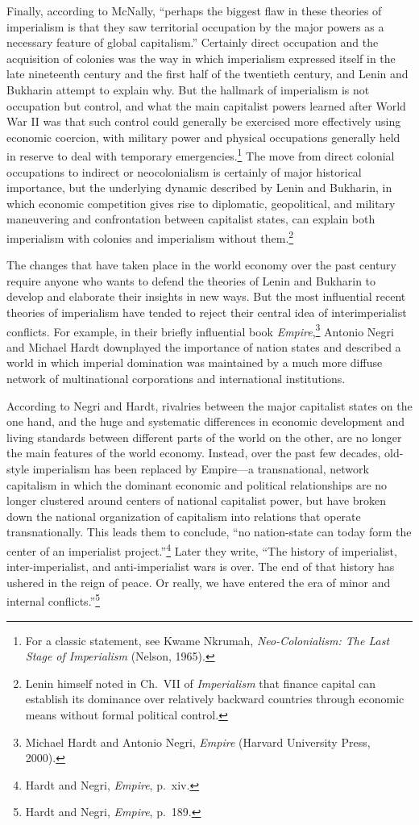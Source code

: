 Finally, according to McNally, ``perhaps the biggest flaw in these theories of imperialism is that they saw territorial occupation by the major powers as a necessary feature of global capitalism.'' Certainly direct occupation and the acquisition of colonies was the way in which imperialism expressed itself in the late nineteenth century and the first half of the twentieth century, and Lenin and Bukharin attempt to explain why. But the hallmark of imperialism is not occupation but control, and what the main capitalist powers learned after World War II was that such control could generally be exercised more effectively using economic coercion, with military power and physical occupations generally held in reserve to deal with temporary emergencies.\footnote{For a classic statement, see Kwame Nkrumah, \emph{Neo-Colonialism: The Last Stage of Imperialism} (Nelson, 1965).} The move from direct colonial occupations to indirect or neocolonialism is certainly of major historical importance, but the underlying dynamic described by Lenin and Bukharin, in which economic competition gives rise to diplomatic, geopolitical, and military maneuvering and confrontation between capitalist states, can explain both imperialism with colonies and imperialism without them.\footnote{Lenin himself noted in Ch.\ VII of \emph{Imperialism} that finance capital can establish its dominance over relatively backward countries through economic means without formal political control.}

The changes that have taken place in the world economy over the past century require anyone who wants to defend the theories of Lenin and Bukharin to develop and elaborate their insights in new ways. But the most influential recent theories of imperialism have tended to reject their central idea of interimperialist conflicts. For example, in their briefly influential book \emph{Empire},\footnote{Michael Hardt and Antonio Negri, \emph{Empire} (Harvard University Press, 2000).} Antonio Negri and Michael Hardt downplayed the importance of nation states and described a world in which imperial domination was maintained by a much more diffuse network of multinational corporations and international institutions.

According to Negri and Hardt, rivalries between the major capitalist states on the one hand, and the huge and systematic differences in economic development and living standards between different parts of the world on the other, are no longer the main features of the world economy. Instead, over the past few decades, old-style imperialism has been replaced by Empire---a transnational, network capitalism in which the dominant economic and political relationships are no longer clustered around centers of national capitalist power, but have broken down the national organization of capitalism into relations that operate transnationally. This leads them to conclude, ``no nation-state can today form the center of an imperialist project.''\footnote{Hardt and Negri, \emph{Empire}, p.\ xiv.} Later they write, ``The history of imperialist, inter-imperialist, and anti-imperialist wars is over. The end of that history has ushered in the reign of peace. Or really, we have entered the era of minor and internal conflicts.''\footnote{Hardt and Negri, \emph{Empire}, p.\ 189.}

